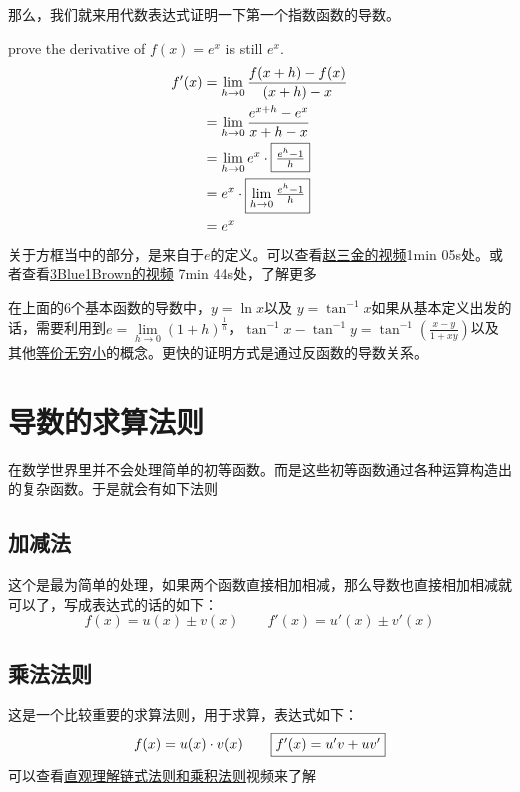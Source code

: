 那么，我们就来用代数表达式证明一下第一个指数函数的导数。
\begin{ExampleBox}
prove the derivative of $f(x)=e^x$ is still $e^x$.
\tcblower
\begin{align*}
  f'(x) &=\lim\limits_{h\to 0} \frac{f(x+h)-f(x)}{(x+h)-x}\\
        &=\lim\limits_{h\to 0}\frac{e^{x+h}-e^x}{x+h-x}\\
        &=\lim\limits_{h\to 0} e^x \cdot \fbox{$\frac{e^h-1}{h}$}\\
        &=e^x \cdot \fbox{$\lim\limits_{h\to 0}\frac{e^h-1}{h}$}\\
        &=e^x
\end{align*}
关于方框当中的部分，是来自于$e$的定义。可以查看\href{https://www.bilibili.com/video/BV15a4y1v74j}{赵三金的视频}1min 05s处。或者查看\href{https://www.bilibili.com/video/BV11x411e7FN}{3Blue1Brown的视频} 7min 44s处，了解更多
\end{ExampleBox}

在上面的$6$个基本函数的导数中，$y=\ln x$以及 $y=\tan^{-1} x$如果从基本定义出发的话，需要利用到$e=\lim\limits_{h\to 0} \left(1+h\right)^{\frac{1}{h}}$，$\tan^{-1} x-\tan^{-1}y =\tan^{-1}\left(\frac{x-y}{1+xy}\right)$以及其他\href{https://www.desmos.com/calculator/sjsgmj4htx}{等价无穷小}的概念。更快的证明方式是通过反函数的导数关系。

\clearpage

\section{导数的求算法则}
在数学世界里并不会处理简单的初等函数。而是这些初等函数通过各种运算构造出的复杂函数。于是就会有如下法则

\subsection*{加减法}
这个是最为简单的处理，如果两个函数直接相加相减，那么导数也直接相加相减就可以了，写成表达式的话的如下：
\[
	f(x)=u(x)\pm v(x)  \qquad f'(x)=u'(x)\pm v'(x)
\]

\subsection*{乘法法则}
这是一个比较重要的求算法则，用于求算，表达式如下：
\[
	f(x) = u(x)\cdot v(x) \qquad \fbox{$f'(x)=u'v + uv'$}
\]
可以查看\href{https://www.bilibili.com/video/BV1Sx411m7Zz}{直观理解链式法则和乘积法则}视频来了解

